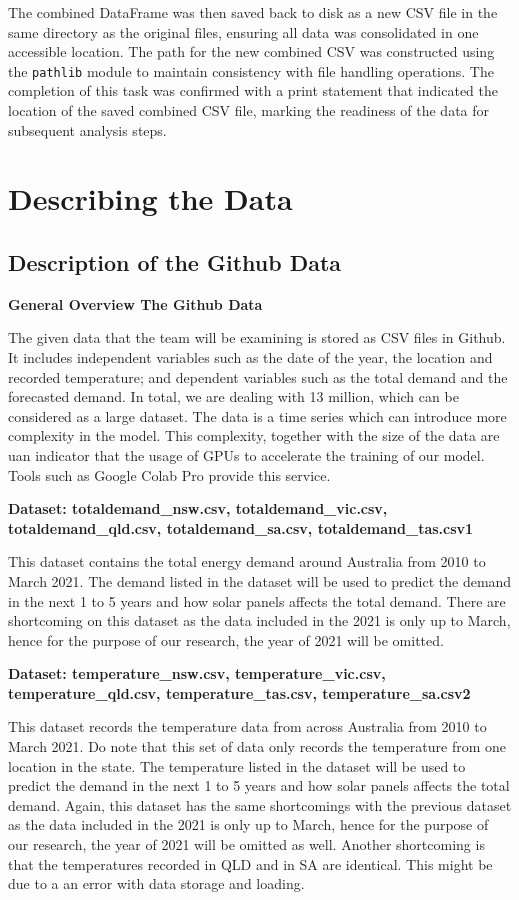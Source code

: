\documentclass[mstat,12pt]{unswthesis}
\begin{document}
The combined DataFrame was then saved back to disk as a new CSV file in
the same directory as the original files, ensuring all data was
consolidated in one accessible location. The path for the new combined
CSV was constructed using the \texttt{pathlib} module to maintain
consistency with file handling operations. The completion of this task
was confirmed with a print statement that indicated the location of the
saved combined CSV file, marking the readiness of the data for
subsequent analysis steps.

\section{Describing the Data}\label{describing-the-data}

\subsection{Description of the Github
Data}\label{description-of-the-github-data}

\textbf{General Overview The Github Data}

The given data that the team will be examining is stored as CSV files in
Github. It includes independent variables such as the date of the year,
the location and recorded temperature; and dependent variables such as
the total demand and the forecasted demand. In total, we are dealing
with 13 million, which can be considered as a large dataset. The data is
a time series which can introduce more complexity in the model. This
complexity, together with the size of the data are uan indicator that
the usage of GPUs to accelerate the training of our model. Tools such as
Google Colab Pro provide this service.

\textbf{Dataset: totaldemand\_nsw.csv, totaldemand\_vic.csv,
totaldemand\_qld.csv, totaldemand\_sa.csv, totaldemand\_tas.csv1}

This dataset contains the total energy demand around Australia from 2010
to March 2021. The demand listed in the dataset will be used to predict
the demand in the next 1 to 5 years and how solar panels affects the
total demand. There are shortcoming on this dataset as the data included
in the 2021 is only up to March, hence for the purpose of our research,
the year of 2021 will be omitted.

\textbf{Dataset: temperature\_nsw.csv, temperature\_vic.csv,
temperature\_qld.csv, temperature\_tas.csv, temperature\_sa.csv2}

This dataset records the temperature data from across Australia from
2010 to March 2021. Do note that this set of data only records the
temperature from one location in the state. The temperature listed in
the dataset will be used to predict the demand in the next 1 to 5 years
and how solar panels affects the total demand. Again, this dataset has
the same shortcomings with the previous dataset as the data included in
the 2021 is only up to March, hence for the purpose of our research, the
year of 2021 will be omitted as well. Another shortcoming is that the
temperatures recorded in QLD and in SA are identical. This might be due
to a an error with data storage and loading.
\end{document}
